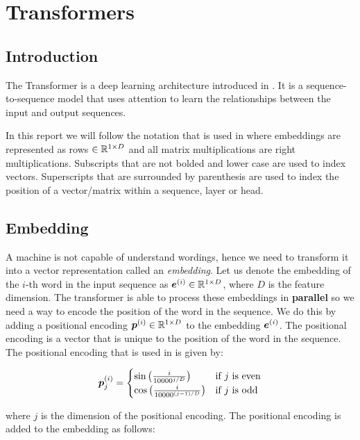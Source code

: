 \documentclass[../main.tex]{subfiles}
\begin{document}
\section{Transformers}
\subsection{Introduction}

The Transformer is a deep learning architecture introduced in \cite{vaswani2017attention}. It is a sequence-to-sequence model that uses attention to learn the relationships between the input and output sequences.

In this report we will follow the notation that is used in \cite{vaswani2017attention} where embeddings are represented as rows $\in \mathbb{R}^{1 \times D}$ and all matrix multiplications are right multiplications. Subscripts that are not bolded and lower case are used to index vectors. Superscripts that are surrounded by parenthesis are used to index the position of a vector/matrix within a sequence, layer or head. 

\subsection{Embedding}

A machine is not capable of understand wordings, hence we need to transform it into a vector representation called an \emph{embedding}. Let us denote the embedding of the $i$-th word in the input sequence as $\bm{e}^{(i)} \in \mathbb{R}^{1 \times D}$, where $D$ is the feature dimension. The transformer is able to process these embeddings in \textbf{parallel} so we need a way to encode the position of the word in the sequence. We do this by adding a positional encoding $\bm{p}^{(i)} \in \mathbb{R}^{1 \times D}$ to the embedding $\bm{e}^{(i)}$. The positional encoding is a vector that is unique to the position of the word in the sequence. The positional encoding that is used in \cite{vaswani2017attention} is given by:

\begin{equation}
	\bm{p}_j^{(i)} = \begin{cases}
		\sin\left(\frac{i}{10000^{j/D}}\right) & \text{if } j \text{ is even} \\
		\cos\left(\frac{i}{10000^{(j-1)/D}}\right) & \text{if } j \text{ is odd}
	\end{cases}
\end{equation}

\noi where $j$ is the dimension of the positional encoding. The positional encoding is added to the embedding as follows:
\end{document}
